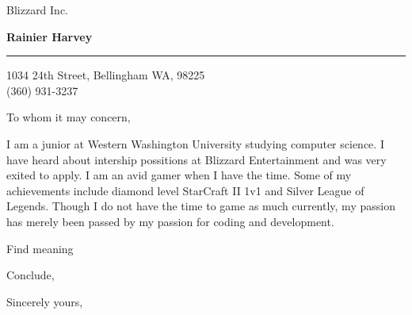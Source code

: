 \documentclass{letter} %
\begin{document}
\signature{%
Rainier Harvey}           %
\longindentation=0pt                       %
\let\raggedleft\raggedright                %
 
 
\begin{letter}{Blizzard Inc. \\}


\begin{flushleft}
{\large\bf Rainier Harvey}
\end{flushleft}
\medskip\hrule height 1pt
\begin{flushright}
\hfill 1034 24th Street, Bellingham WA, 98225\\
\hfill (360) 931-3237 
\end{flushright} 
\vfill %

 
\opening{To whom it may concern,} 
 
\noindent I am a junior at Western Washington University studying computer science. I have heard about intership possitions at Blizzard Entertainment and was very exited to apply. 
I am an avid gamer when I have the time. Some of my achievements include diamond level StarCraft II 1v1 and Silver League of Legends. Though I do not have the time to game as much currently, 
my passion has merely been passed by my passion for coding and development.
 
\noindent Find meaning  
 
\noindent Conclude, 
 
\closing{Sincerely yours,} 

 
\end{letter}
 
\end{document}
